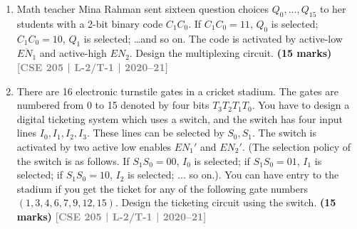 \documentclass[12pt]{article}
\newcommand{\yr}[1]{\hfill\textcolor{gray}{\small\textbf{[#1]}}}
\newcommand{\mk}[1]{\textcolor{orange!70!black}{\small\textbf{(#1 marks)}}}
\begin{document}
\begin{enumerate}
\begin{center}
\end{center}

\mk{12} \yr{CSE 205 | L-2/T-1 | 2021--22}



\item Math teacher Mina Rahman sent sixteen question choices $Q_0,\ldots,Q_{15}$ to her students with a 2-bit binary code $C_1C_0$. If $C_1C_0=11$, $Q_0$ is selected; $C_1C_0=10$, $Q_1$ is selected; \ldots and so on. The code is activated by active-low $\overline{EN_1}$ and active-high $EN_2$. Design the multiplexing circuit.
\mk{15} \yr{CSE 205 | L-2/T-1 | 2020--21}



\item There are 16 electronic turnstile gates in a cricket stadium. The gates are numbered from 0 to 15 denoted by four bits $T_3T_2T_1T_0$. You have to design a digital ticketing system which uses a switch, and the switch has four input lines $I_0, I_1, I_2, I_3$. These lines can be selected by $S_0, S_1$. The switch is activated by two active low enables $EN_1'$ and $EN_2'$. (The selection policy of the switch is as follows. If $S_1S_0 = 00$, $I_0$ is selected; if $S_1S_0 = 01$, $I_1$ is selected; if $S_1S_0 = 10$, $I_2$ is selected; ... so on.). You can have entry to the stadium if you get the ticket for any of the following gate numbers $(1, 3, 4, 6, 7, 9, 12, 15)$. Design the ticketing circuit using the switch.
\mk{15} \yr{CSE 205 | L-2/T-1 | 2020--21}




\end{enumerate}
\end{document}
